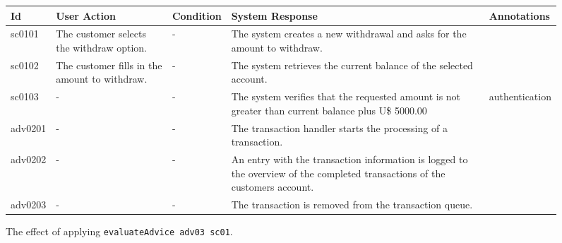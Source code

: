 \documentclass{article}
\begin{document}
\begin{figure}[htb]
 
\begin{tabular}{|p{0.4in}|p{1.2in}|p{1.2in}|p{1.2in}|p{1.2in}|} \hline Id & User Action & Condition & System Response & Annotations \\ \hline sc0101 & The customer selects the withdraw option. & - & The system creates a new withdrawal and asks for the amount to withdraw. & \\ \hline sc0102 & The customer fills in the amount to withdraw. & - & The system retrieves the current balance of the selected account. & \\ \hline sc0103 & - & - & The system verifies that the requested amount is not greater than current balance plus U\$ 5000.00 & authentication \\ \hline adv0201 & - & - & The transaction handler starts the processing of a transaction. & \\ \hline adv0202 & - & - & An entry with the transaction information is logged to the overview of the completed transactions of the customers account. & \\ \hline adv0203 & - & - & The transaction is removed from the transaction queue. & \\ \hline \end{tabular}
 \caption{The effect of applying \texttt{evaluateAdvice adv03 sc01}.}
 \label{fig:eval-adv03}
\end{figure}

\newpage 
\end{document}
